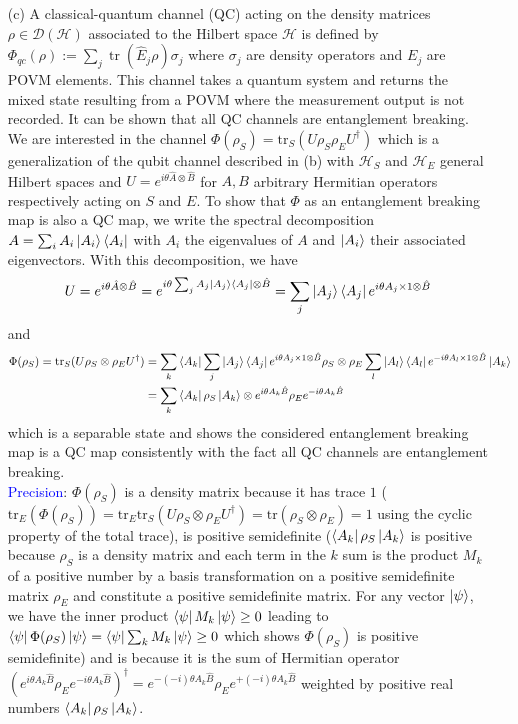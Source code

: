 \documentclass[10pt, a4paper]{article}
\begin{document}
{\begin{enumerate}
  \item[(c)] A classical-quantum channel (QC) acting on the density matrices $\rho \in \mathcal{D}(\mathcal{H})$ associated to the Hilbert space $\mathcal{H}$ is defined by $\Phi_{qc}(\rho) := \sum_j \operatorname{tr}\left(\hat{E}_j \rho\right) \sigma_j$ where $\sigma_j$ are density operators and $E_j$ are POVM elements. This channel takes a quantum system and returns the mixed state resulting from a POVM where the measurement output is not recorded. It can be shown that all QC channels are entanglement breaking. We are interested in the channel $\Phi(\rho_S) = \text{tr}_S(U \rho_S \rho_E U^\dagger)$ which is a generalization of the qubit channel described in (b) with $\mathcal{H}_S$ and $\mathcal{H}_E$ general Hilbert spaces and $U = e^{i \theta \hat{A} \otimes \hat{B}}$ for $A, B$ arbitrary Hermitian operators respectively acting on $S$ and $E$. To show that $\Phi$ as an entanglement breaking map is also a QC map, we write the spectral decomposition $A = \sum_i A_i \ket{A_i}\bra{A_i}$ with $A_i$ the eigenvalues of $A$ and $\ket{A_i}$ their associated eigenvectors. With this decomposition, we have 
  \begin{align*}
    U = e^{i \theta \hat{A} \otimes \hat{B}} =  e^{i \theta \sum_j A_j \ket{A_j}\bra{A_j} \otimes \hat{B}} = \sum_j \ket{A_j}\bra{A_j} e^{i \theta  A_j \times 1 \otimes \hat{B}}
  \end{align*}
  and 
  \begin{align*}
    \Phi(\rho_S) = \text{tr}_S (U \rho_S\otimes\rho_E U^\dagger) &= \sum_k \bra{A_k}    \sum_j \ket{A_j}\bra{A_j} e^{i \theta  A_j \times 1 \otimes \hat{B}} \rho_S\otimes\rho_E \sum_l \ket{A_l}\bra{A_l} e^{-i \theta  A_l \times 1 \otimes \hat{B}} \ket{A_k}  \\
    &= \sum_k  \bra{A_k}\rho_S\ket{A_k}\otimes  e^{i \theta  A_k \hat{B}}\rho_E e^{-i \theta  A_k \hat{B}} 
  \end{align*}
  which is a separable state and shows the considered entanglement breaking map is a QC map consistently with the fact all QC channels are entanglement breaking.\\
  \textcolor{blue}{Precision}: $\Phi(\rho_S)$ is a density matrix because it has trace $1$ ($\text{tr}_E(\Phi(\rho_S)) = \text{tr}_E \text{tr}_S (U \rho_S\otimes\rho_E U^\dagger) = \text{tr}(\rho_S\otimes\rho_E) = 1$ using the cyclic property of the total trace), is positive semidefinite ($\bra{A_k}\rho_S\ket{A_k}$ is positive because $\rho_S$ is a density matrix and each term in the $k$ sum is the product $M_k$ of a positive number by a basis transformation on a positive semidefinite matrix $\rho_E$ and constitute a positive semidefinite matrix. For any vector $\ket{\psi}$, we have the inner product $\bra{\psi} M_k \ket{\psi} \geq 0$ leading to $\bra{\psi}\Phi(\rho_S)\ket{\psi} = \bra{\psi} \sum_k M_k \ket{\psi} \geq 0$ which shows $\Phi(\rho_S)$ is positive semidefinite) and is because it is the sum of Hermitian operator $(e^{i \theta  A_k \hat{B}}\rho_E e^{-i \theta  A_k \hat{B}})^\dagger = e^{-(-i) \theta  A_k \hat{B}}\rho_E e^{+(-i) \theta  A_k \hat{B}}$ weighted by positive real numbers $\bra{A_k}\rho_S\ket{A_k}$. 
\end{enumerate}


}
\end{document}

